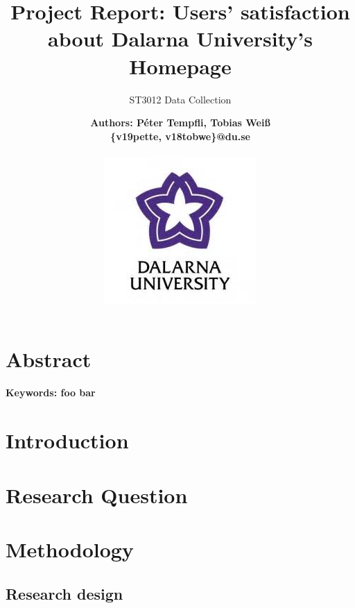 \documentclass[12pt,a4paper,paper=a4,oneside,titlepage,pdftex]{scrartcl}
\begin{document}
	

\title{Project Report: Users' satisfaction about Dalarna University's Homepage}
\subtitle{ST3012 Data Collection}
\author{
	\bfseries\Large Authors: Péter Tempfli, Tobias Weiß\\
	\{v19pette, v18tobwe\}@du.se
	\\ \\
	\includegraphics[]{figures/du-logo.jpg}\\
}

\maketitle
\tableofcontents
\vspace{25px}

\section{Abstract}
\lipsum[1]
\vspace{10px}
\textbf{Keywords: foo bar}

\section{Introduction}

\section{Research Question}


\section{Methodology}

\subsection{Research design}
\end{document}
